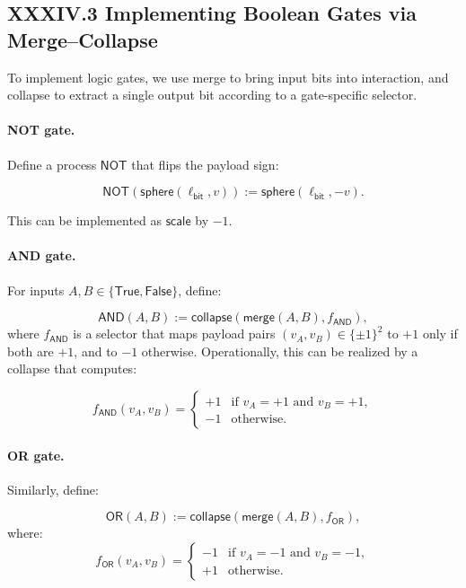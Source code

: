 \documentclass[11pt,letterpaper]{article}
\begin{document}
\subsection{XXXIV.3 Implementing Boolean Gates via Merge--Collapse}

To implement logic gates, we use merge to bring input bits into interaction, and collapse to extract a single output bit according to a gate-specific selector.

\paragraph{NOT gate.}
Define a process $\mathsf{NOT}$ that flips the payload sign:

\[
\mathsf{NOT}( \mathsf{sphere}(\ell_{\mathsf{bit}}, v)) 
:= \mathsf{sphere}(\ell_{\mathsf{bit}}, -v).
\]

This can be implemented as $\mathsf{scale}$ by $-1$.

\paragraph{AND gate.}
For inputs $A,B \in \{\mathsf{True}, \mathsf{False}\}$, define:

\[
\mathsf{AND}(A,B) :=
\mathsf{collapse}(\mathsf{merge}(A,B), f_{\mathsf{AND}}),
\]
where $f_{\mathsf{AND}}$ is a selector that maps payload pairs $(v_A, v_B) \in \{\pm1\}^2$ to $+1$ only if both are $+1$, and to $-1$ otherwise. Operationally, this can be realized by a collapse that computes:

\[
f_{\mathsf{AND}}(v_A, v_B) = 
\begin{cases}
+1 & \text{if } v_A = +1 \text{ and } v_B = +1,\\
-1 & \text{otherwise.}
\end{cases}
\]

\paragraph{OR gate.}
Similarly, define:

\[
\mathsf{OR}(A,B) :=
\mathsf{collapse}(\mathsf{merge}(A,B), f_{\mathsf{OR}}),
\]
where:
\[
f_{\mathsf{OR}}(v_A, v_B) =
\begin{cases}
-1 & \text{if } v_A = -1 \text{ and } v_B = -1,\\
+1 & \text{otherwise.}
\end{cases}
\]
\end{document}
